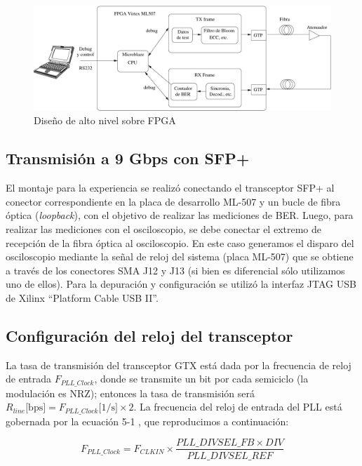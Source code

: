 \begin{figure}[t]
  \centering
    \includegraphics[width=6in]{graphs/fpgadesign.pdf}
\caption {Diseño de alto nivel sobre FPGA}
\label{fig:fpgadesign}
\end{figure}


\subsection{Transmisión a 9 Gbps con SFP+}
El montaje para la experiencia se realizó conectando el transceptor SFP+
al conector correspondiente en la placa de desarrollo ML-507 y un bucle de
fibra óptica ({\em loopback}), con el objetivo de realizar las
mediciones de BER. Luego, para realizar las mediciones con el
osciloscopio, se debe conectar el extremo de recepción de la fibra
óptica al osciloscopio. En este caso generamos el disparo del
osciloscopio mediante la señal de reloj del sistema (placa ML-507) que
se obtiene a través de los conectores SMA J12 y J13 (si bien es
diferencial sólo utilizamos uno de ellos).  Para la depuración y
configuración se utilizó la interfaz JTAG USB de Xilinx ``Platform Cable
USB II''.
\subsection{Configuración del reloj del transceptor}

La tasa de transmisión del transceptor GTX está dada por la
frecuencia de reloj de entrada $F_{PLL\_Clock}$, donde se transmite un
bit por cada semiciclo (la modulación es NRZ); entonces la tasa de
transmisión será
$R_{line}\mbox{[bps]}=F_{PLL\_Clock}\mbox{[1/s]} \times 2$.  La
frecuencia del reloj de entrada del PLL está gobernada por la ecuación
5-1 \cite[Pag. 88]{ug198}, que reproducimos a continuación:

\begin{equation}
F_{PLL\_Clock} = F_{CLKIN} \times \frac{PLL\_DIVSEL\_FB \times
DIV}{PLL\_DIVSEL\_REF}%
\end{equation}\\

